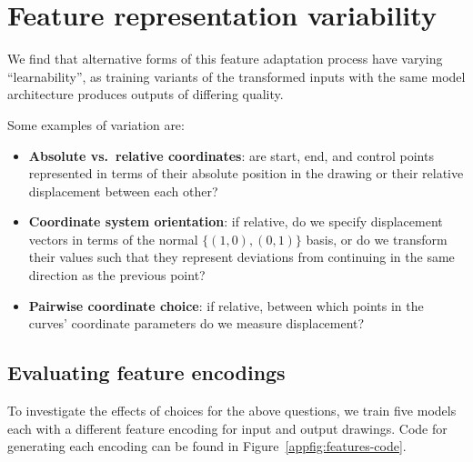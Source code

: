 \chapter{Feature representation variability}\label{chap:feature-variation}
We find that alternative forms of this feature adaptation process have varying ``learnability'', as training variants of the transformed inputs with the same model architecture produces outputs of differing quality.

Some examples of variation are:
\begin{itemize}
\item \textbf{Absolute vs.\ relative coordinates}: are start, end, and control points represented in terms of their absolute position in the drawing or their relative displacement between each other?
\item \textbf{Coordinate system orientation}: if relative, do we specify displacement vectors in terms of the normal $\{(1, 0), (0, 1)\}$ basis, or do we transform their values such that they represent deviations from continuing in the same direction as the previous point?
\item \textbf{Pairwise coordinate choice}: if relative, between which points in the curves' coordinate parameters do we measure displacement?
\end{itemize}

\section{Evaluating feature encodings}\label{sec:eval-encs}
To investigate the effects of choices for the above questions, we train five models each with a different feature encoding for input and output drawings. Code for generating each encoding can be found in Figure~\ref{appfig:features-code}.

